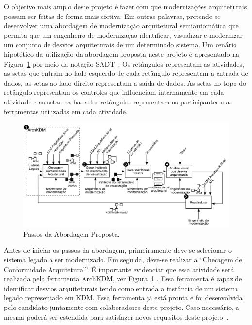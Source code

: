 \documentclass[12pt]{article}
\begin{document}
O objetivo mais amplo deste projeto é fazer com que modernizações arquiteturais possam ser feitas de forma mais efetiva. Em outras palavras, pretende-se desenvolver uma abordagem de modernização arquitetural semiautomática que permita que um engenheiro de modernização identificar, visualizar e modernizar um conjunto de desvios arquiteturais de um determinado sistema. %
%
Um cenário hipotético da utilização da abordagem proposta neste projeto é apresentado na Figura~\ref{fig:approach_steps} por meio da notação SADT~\cite{Marcaraf}. Os retângulos representam as atividades, as setas que entram no lado esquerdo de cada retângulo representam a entrada de dados, as setas ao lado direito representam a saída de dados. As setas no topo do retângulo representam os controles que influenciam internamente em cada atividade e as setas na base dos retângulos representam os participantes e as ferramentas utilizadas em cada atividade.

\begin{figure}[htb]
 \label{fig:approach_steps}
 \centering
 \includegraphics[scale=0.6]{projeto_pos_doc_figura6.pdf}
 \caption{Passos da Abordagem Proposta.}
\end{figure}

Antes de iniciar os passos da abordagem, primeiramente deve-se selecionar o sistema legado a ser modernizado. Em seguida, deve-se realizar a ``Checagem de Conformidade Arquitetural''. É importante evidenciar que essa atividade será realizada pela ferramenta ArchKDM, ver Figura~\ref{fig:approach_steps} . Essa ferramenta é capaz de identificar desvios arquiteturais tendo como entrada a instância de um sistema legado representado em KDM. Essa ferramenta já está pronta e foi desenvolvida pelo candidato juntamente com colaboradores deste projeto. Caso necessário, a mesma poderá ser estendida para satisfazer novos requisitos deste projeto~\cite{source_miner_glauco, daniel_san_journal}. 
\end{document}
